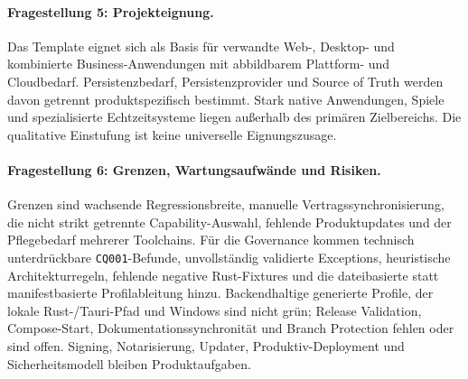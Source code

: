 \paragraph{Fragestellung 5: Projekteignung.}
Das Template eignet sich als Basis für verwandte Web-, Desktop- und
kombinierte Business-Anwendungen mit abbildbarem Plattform- und Cloudbedarf.
Persistenzbedarf, Persistenzprovider und Source of Truth werden davon getrennt
produktspezifisch bestimmt. Stark native Anwendungen, Spiele und spezialisierte
Echtzeitsysteme liegen außerhalb des primären Zielbereichs. Die qualitative
Einstufung ist keine universelle Eignungszusage.

\paragraph{Fragestellung 6: Grenzen, Wartungsaufwände und Risiken.}
Grenzen sind wachsende Regressionsbreite, manuelle Vertragssynchronisierung,
die nicht strikt getrennte Capability-Auswahl, fehlende Produktupdates und der
Pflegebedarf mehrerer Toolchains. Für die Governance kommen technisch
unterdrückbare \texttt{CQ001}-Befunde, unvollständig validierte Exceptions,
heuristische Architekturregeln, fehlende negative Rust-Fixtures und die
dateibasierte statt manifestbasierte Profilableitung hinzu. Backendhaltige
generierte Profile, der lokale Rust-/Tauri-Pfad und Windows sind nicht grün;
Release Validation, Compose-Start, Dokumentationssynchronität und Branch
Protection fehlen oder sind offen.
Signing, Notarisierung, Updater, Produktiv-Deployment und Sicherheitsmodell
bleiben Produktaufgaben.
